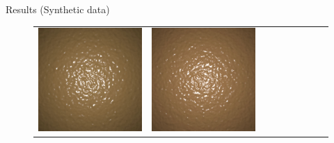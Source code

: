 \documentclass[final]{beamer}
\newlength{\twocolwid}
\newlength{\resultwidth}
\begin{document}
\begin{frame}[t]
\begin{columns}[t]
\begin{column}{\twocolwid}
\begin{block}{Results (Synthetic data)}
\begin{figure}[t]
\begin{tabular}{ccrclcccc}
            		\includegraphics[width=\resultwidth]{synth/bump/good1.jpg} &
            		\includegraphics[width=\resultwidth]{synth/bump/good2.jpg} &

\end{tabular}
\end{figure}
\end{block}
\end{column}
\end{columns}
\end{frame}
\end{document}
